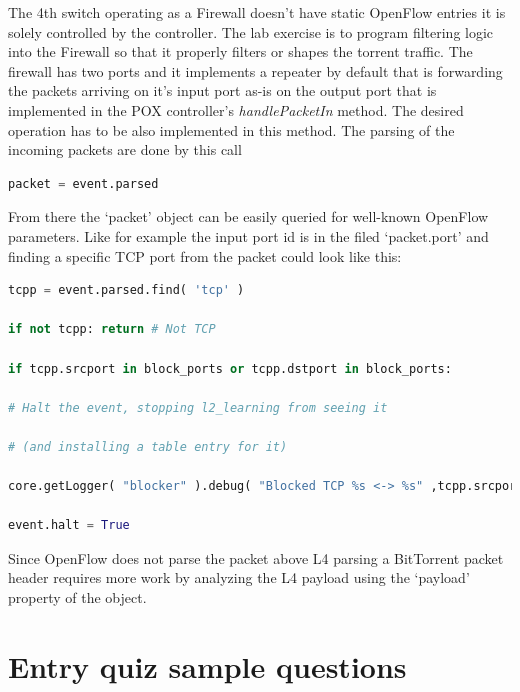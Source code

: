 \documentclass[a4paper]{article}
\begin{document}
The 4th switch operating as a Firewall doesn't have static OpenFlow entries it is solely controlled by the controller.
The lab exercise is to program filtering logic into the Firewall so that it properly filters or shapes the torrent
traffic. The firewall has two ports and it implements a repeater by default that is forwarding the packets arriving on
it's input port as-is on the output port that is implemented in the POX controller's \emph{handlePacketIn} method. The
desired operation has to be also implemented in this method. The parsing of the incoming packets are done by this call
\begin{lstlisting}[language=python,frame=single,breaklines]
packet = event.parsed  
\end{lstlisting}

From there the `packet' object can be easily queried for well-known OpenFlow parameters. Like for example the input
port id is in the filed `packet.port' and finding a specific TCP port from the packet could look like this:

\begin{lstlisting}[language=python,frame=single,breaklines]
tcpp = event.parsed.find( 'tcp' )

if not tcpp: return # Not TCP

if tcpp.srcport in block_ports or tcpp.dstport in block_ports:

# Halt the event, stopping l2_learning from seeing it

# (and installing a table entry for it)

core.getLogger( "blocker" ).debug( "Blocked TCP %s <-> %s" ,tcpp.srcport, tcpp.dstport)

event.halt = True
\end{lstlisting}

Since OpenFlow does not parse the packet above L4 parsing a BitTorrent packet header requires more work by analyzing
the L4 payload using the `payload' property of the object.

\appendix

\section{Entry quiz sample questions}
\end{document}
